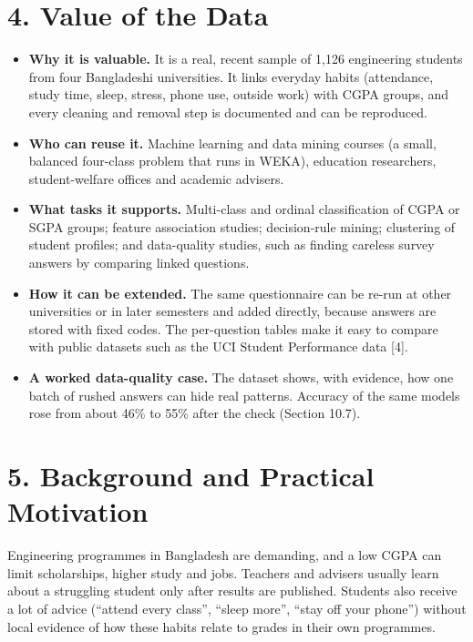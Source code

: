 \documentclass[11pt,a4paper]{article}
\begin{document}
\section{4. Value of the Data}
\begin{itemize}
\item \textbf{Why it is valuable.} It is a real, recent sample of 1,126 engineering students from four Bangladeshi universities. It links everyday habits (attendance, study time, sleep, stress, phone use, outside work) with CGPA groups, and every cleaning and removal step is documented and can be reproduced.
\item \textbf{Who can reuse it.} Machine learning and data mining courses (a small, balanced four-class problem that runs in WEKA), education researchers, student-welfare offices and academic advisers.
\item \textbf{What tasks it supports.} Multi-class and ordinal classification of CGPA or SGPA groups; feature association studies; decision-rule mining; clustering of student profiles; and data-quality studies, such as finding careless survey answers by comparing linked questions.
\item \textbf{How it can be extended.} The same questionnaire can be re-run at other universities or in later semesters and added directly, because answers are stored with fixed codes. The per-question tables make it easy to compare with public datasets such as the UCI Student Performance data [4].
\item \textbf{A worked data-quality case.} The dataset shows, with evidence, how one batch of rushed answers can hide real patterns. Accuracy of the same models rose from about 46\% to 55\% after the check (Section 10.7).
\end{itemize}

\section{5. Background and Practical Motivation}
Engineering programmes in Bangladesh are demanding, and a low CGPA can limit scholarships, higher study and jobs. Teachers and advisers usually learn about a struggling student only after results are published. Students also receive a lot of advice (``attend every class'', ``sleep more'', ``stay off your phone'') without local evidence of how these habits relate to grades in their own programmes.
\end{document}
